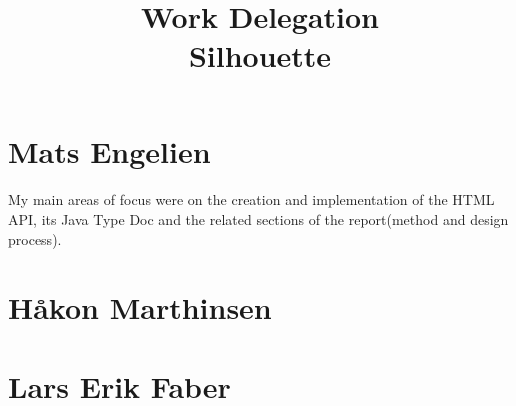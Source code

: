 \documentclass[12pt]{article}
\begin{document}
\title{%
    Work Delegation\\
    \large Silhouette}
\date{}
\maketitle

\section{Mats Engelien}
    \paragraph{}
    My main areas of focus were on the creation and implementation of the HTML API, its Java Type Doc and the related sections of the report(method and design process).
    
\section{Håkon Marthinsen}

\section{Lars Erik Faber}
\end{document}

